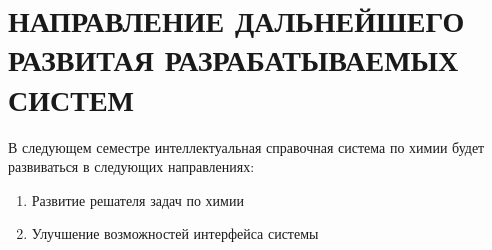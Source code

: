 \section{НАПРАВЛЕНИЕ ДАЛЬНЕЙШЕГО РАЗВИТАЯ РАЗРАБАТЫВАЕМЫХ СИСТЕМ}
\label{sec:domain}
В следующем семестре интеллектуальная справочная система по химии будет развиваться в следующих направлениях:
\begin{enumerate}
	\item Развитие решателя задач по химии
	\item Улучшение возможностей интерфейса системы
\end{enumerate}

